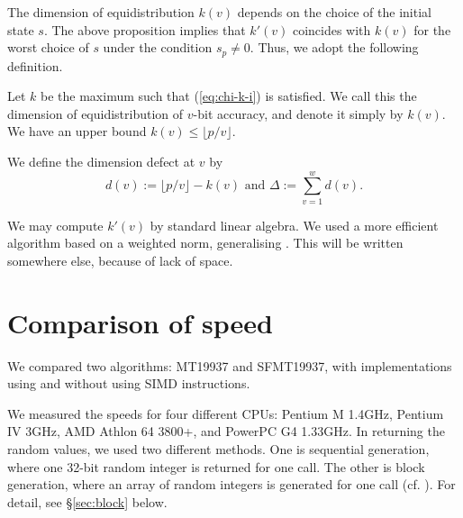 \documentclass{svmult}
\begin{document}
The dimension of equidistribution $k(v)$ depends on 
the choice of the initial state $s$. The above 
proposition implies that $k'(v)$ coincides 
with $k(v)$ for the worst choice of $s$ under the condition 
$s_p \neq 0$. Thus, we adopt the following definition.

\begin{definition}\label{def:virtual}
Let $k$ be the maximum such that
(\ref{eq:chi-k-i}) is satisfied. We call this
the dimension of equidistribution
of $v$-bit accuracy, and denote it simply by $k(v)$.
We have an upper bound $k(v) \leq \lfloor p/v \rfloor$.

We define the dimension defect at $v$
by
$$
d(v):=\lfloor p/v \rfloor - k(v) 
\mbox{ and } \Delta:=\sum_{v=1}^w d(v).
$$
\end{definition}
We may compute $k'(v)$ by standard linear algebra.
We used a more efficient algorithm based on 
a weighted norm,
generalising \cite{CLT}. This will be written 
somewhere else,
because of lack of space.


\section{Comparison of  speed}\label{sec:comp-speed}
We compared two algorithms: MT19937 and SFMT19937,
with implementations using and without using SIMD instructions.

We measured the speeds for four different CPUs:
Pentium M 1.4GHz, Pentium IV 3GHz, 
AMD Athlon 64 3800+, and PowerPC G4 1.33GHz.  
In returning the random values, we used two different methods.
One is sequential generation, where one 32-bit random 
integer is returned for one call. 
The other is block generation, where an array
of random integers is generated for one call 
(cf. \cite{knuth:bible}). 
For detail, see \S\ref{sec:block} below. 
\end{document}
